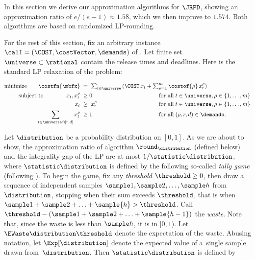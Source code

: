 





In this section we derive our approximation algorithms for $\JRPD$, showing an
approximation ratio of $e/(e-1)\approx 1.58$, which we then improve to $1.574$.
Both algorithms are based on randomized LP-rounding.



For the rest of this section, fix an arbitrary instance
$\calI = (\COST, \costVector,\demands)$ of {\JRPD}.
Let finite set $\universe\subset\rational$ contain the release times and deadlines.
Here is the standard LP relaxation of the problem:

\begin{alignat}{3}
	\textrm{minimize}\quad\quad  \costfn{\mbfx} \;&=\;  
        \textstyle \sum_{t\in\universe} {(\COST\,x_{t} + \sum_{\rho=1}^m{\costof{\rho}\, x^\rho_t})}
											\hspace{-1.3in}&&
	\notag \\
	\textrm{subject to}\quad\quad\quad\quad 
			\textstyle x_t, x^\rho_t \;&\ge 0\;
											&	&\textrm{for all}\; t \in \universe, \rho \in \{1, \ldots, m\}
	\notag
        \\
        \textstyle	x_t  \;&\geq\;  x^\rho_t 
	 										&	&\textrm{for all}\; t \in \universe, \rho \in \{1, \ldots, m\}
	\label{eqn: density bound}
	\\
			 \sum_{t\in \universe\cap[r,d]} {x^\rho_t} \;&\geq 1\;
											&	&\textrm{for all}\; (\rho,r,d) \in \demands.
	\label{eqn: satisfy bound}
\end{alignat}

Let $\distribution$ be a probability distribution on $[0,1]$. As we are about to show,
the approximation ratio of algorithm $\round_\distribution$ (defined below)
and the integrality gap of the LP
are at most $1/\statistic \distribution$, where $\statistic \distribution$ 
is defined by the following so-called {\em tally game} (following \cite{jrp-deadlines-nonner}).
To begin the game, fix any {\em threshold} $\threshold \ge 0$,
then draw a sequence of independent samples $\sample 1,\sample 2,\ldots,\sample h$ 
from $\distribution$, stopping when their sum exceeds $\threshold$,
that is when $\sample 1+\sample 2+\ldots+\sample {h} > \threshold$.
Call $\threshold- (\sample 1+\sample 2+\ldots+\sample {h-1})$ the {\em waste}.
Note that, since the waste is less than $\sample h$, it is in $[0,1)$.
Let $\EWaste \distribution \threshold$ denote the expectation of the waste.
Abusing notation, let $\Exp[\distribution]$ denote the expected value of a~single sample drawn from~$\distribution$.
Then $\statistic \distribution$ is defined by

